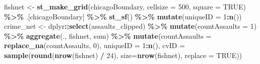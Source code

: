 \documentclass[
]{article}
\newenvironment{Shaded}{\begin{snugshade}}{\end{snugshade}}
\newcommand{\AttributeTok}[1]{\textcolor[rgb]{0.13,0.29,0.53}{#1}}
\newcommand{\ConstantTok}[1]{\textcolor[rgb]{0.56,0.35,0.01}{#1}}
\newcommand{\DecValTok}[1]{\textcolor[rgb]{0.00,0.00,0.81}{#1}}
\newcommand{\FunctionTok}[1]{\textcolor[rgb]{0.13,0.29,0.53}{\textbf{#1}}}
\newcommand{\NormalTok}[1]{#1}
\newcommand{\OtherTok}[1]{\textcolor[rgb]{0.56,0.35,0.01}{#1}}
\newcommand{\SpecialCharTok}[1]{\textcolor[rgb]{0.81,0.36,0.00}{\textbf{#1}}}
\begin{document}
\begin{Shaded}
\begin{Highlighting}[]
\NormalTok{fishnet }\OtherTok{\textless{}{-}} 
  \FunctionTok{st\_make\_grid}\NormalTok{(chicagoBoundary,}
               \AttributeTok{cellsize =} \DecValTok{500}\NormalTok{, }
               \AttributeTok{square =} \ConstantTok{TRUE}\NormalTok{) }\SpecialCharTok{\%\textgreater{}\%}
\NormalTok{  .[chicagoBoundary] }\SpecialCharTok{\%\textgreater{}\%}
  \FunctionTok{st\_sf}\NormalTok{() }\SpecialCharTok{\%\textgreater{}\%}
  \FunctionTok{mutate}\NormalTok{(}\AttributeTok{uniqueID =} \DecValTok{1}\SpecialCharTok{:}\FunctionTok{n}\NormalTok{())}
\NormalTok{crime\_net }\OtherTok{\textless{}{-}} 
\NormalTok{  dplyr}\SpecialCharTok{::}\FunctionTok{select}\NormalTok{(assaults\_clipped) }\SpecialCharTok{\%\textgreater{}\%} 
  \FunctionTok{mutate}\NormalTok{(}\AttributeTok{countAssaults =} \DecValTok{1}\NormalTok{) }\SpecialCharTok{\%\textgreater{}\%} 
  \FunctionTok{aggregate}\NormalTok{(., fishnet, sum) }\SpecialCharTok{\%\textgreater{}\%}
  \FunctionTok{mutate}\NormalTok{(}\AttributeTok{countAssaults =} \FunctionTok{replace\_na}\NormalTok{(countAssaults, }\DecValTok{0}\NormalTok{),}
         \AttributeTok{uniqueID =} \DecValTok{1}\SpecialCharTok{:}\FunctionTok{n}\NormalTok{(),}
         \AttributeTok{cvID =} \FunctionTok{sample}\NormalTok{(}\FunctionTok{round}\NormalTok{(}\FunctionTok{nrow}\NormalTok{(fishnet) }\SpecialCharTok{/} \DecValTok{24}\NormalTok{), }
                       \AttributeTok{size=}\FunctionTok{nrow}\NormalTok{(fishnet), }\AttributeTok{replace =} \ConstantTok{TRUE}\NormalTok{))}



\end{Highlighting}
\end{Shaded}
\end{document}
